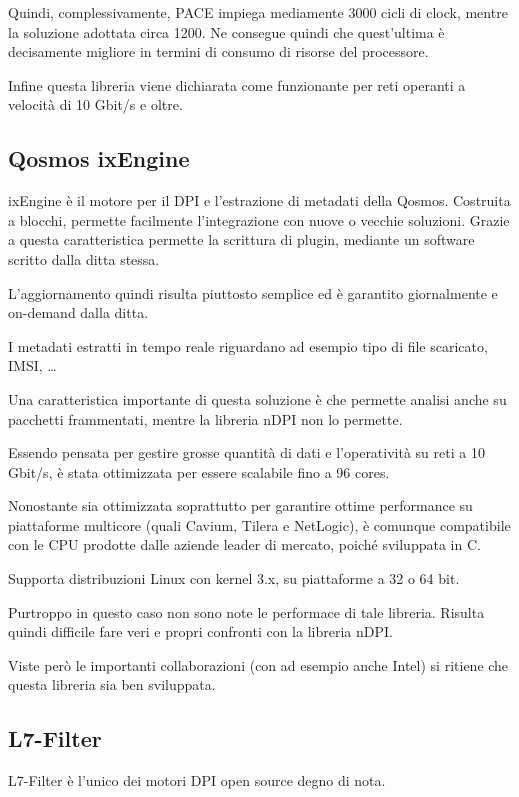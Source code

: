 Quindi, complessivamente, PACE impiega mediamente 3000 cicli di clock, mentre la soluzione adottata circa 1200. Ne consegue quindi che quest'ultima è decisamente migliore in termini di consumo di risorse del processore.

Infine questa libreria viene dichiarata come funzionante per reti operanti a velocità di 10 Gbit/s e oltre.

\subsection{Qosmos ixEngine}

ixEngine \cite{ixe} è il motore per il DPI e l'estrazione di metadati della Qosmos. Costruita a blocchi, permette facilmente l'integrazione con nuove o vecchie soluzioni. Grazie a questa caratteristica permette la scrittura di plugin, mediante un software scritto dalla ditta stessa.

L'aggiornamento quindi risulta piuttosto semplice ed è garantito giornalmente e on-demand dalla ditta.

I metadati estratti in tempo reale riguardano ad esempio tipo di file scaricato, IMSI, \dots

Una caratteristica importante di questa soluzione è che permette analisi anche su pacchetti frammentati, mentre la libreria nDPI non lo permette.

Essendo pensata per gestire grosse quantità di dati e l'operatività su reti a 10 Gbit/s, è stata ottimizzata per essere scalabile fino a 96 cores. 

Nonostante sia ottimizzata soprattutto per garantire ottime performance su piattaforme multicore (quali Cavium, Tilera e NetLogic), è comunque compatibile con le CPU prodotte dalle aziende leader di mercato, poiché sviluppata in C.

Supporta distribuzioni Linux con kernel 3.x, su piattaforme a 32 o 64 bit.

Purtroppo in questo caso non sono note le performace di tale libreria. Risulta quindi difficile fare veri e propri confronti con la libreria nDPI.

Viste però le importanti collaborazioni (con ad esempio anche Intel) si ritiene che questa libreria sia ben sviluppata.

\subsection{L7-Filter}

L7-Filter \cite{l7filter} è l'unico dei motori DPI open source degno di nota.

